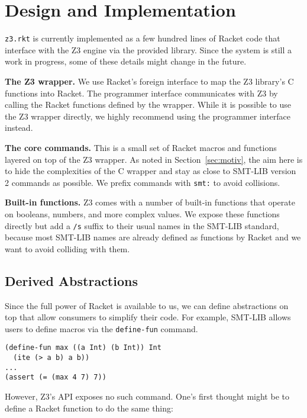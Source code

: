 \section{Design and Implementation}
\label{sec:design-impl}

\texttt{z3.rkt} is currently implemented as a few hundred lines of Racket code
that interface with the Z3 engine via the provided library. Since the system is
still a work in progress, some of these details might change in the future.

\textbf{The Z3 wrapper.} We use Racket's foreign interface \cite{racket/foreign}
to map the Z3 library's C functions into Racket. The programmer interface
communicates with Z3 by calling the Racket functions defined by the
wrapper. While it is possible to use the Z3 wrapper directly, we highly
recommend using the programmer interface instead.

\textbf{The core commands.} This is a small set of Racket macros and functions
layered on top of the Z3 wrapper. As noted in Section~\ref{sec:motiv}, the aim
here is to hide the complexities of the C wrapper and stay as close to SMT-LIB
version 2 commands \cite{smtlib2:10} as possible. We prefix commands with
\texttt{smt:} to avoid collisions.

\textbf{Built-in functions.} Z3 comes with a number of built-in functions that
operate on booleans, numbers, and more complex values. We expose these
functions directly but add a \texttt{/s} suffix to their usual names in the
SMT-LIB standard, because most SMT-LIB names are already defined as functions
by Racket and we want to avoid colliding with them.

\subsection{Derived Abstractions}
\label{sec:derived}

Since the full power of Racket is available to us, we can define abstractions
on top that allow consumers to simplify their code. For example, SMT-LIB
allows users to define macros via the \texttt {define-fun} command.

\begin{verbatim}
(define-fun max ((a Int) (b Int)) Int
  (ite (> a b) a b))
...
(assert (= (max 4 7) 7))
\end{verbatim}

However, Z3's API exposes no such command. One's first thought might be to
define a Racket function to do the same thing:

